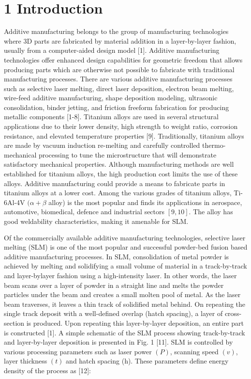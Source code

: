 \documentclass[10pt]{article}
\begin{document}
\section*{1 Introduction}
Additive manufacturing belongs to the group of manufacturing technologies where 3D parts are fabricated by material addition in a layer-by-layer fashion, usually from a computer-aided design model [1]. Additive manufacturing technologies offer enhanced design capabilities for geometric freedom that allows producing parts which are otherwise not possible to fabricate with traditional manufacturing processes. There are various additive manufacturing processes such as selective laser melting, direct laser deposition, electron beam melting, wire-feed additive manufacturing, shape deposition modeling, ultrasonic consolidation, binder jetting, and friction freeform fabrication for producing metallic components [1-8]. Titanium alloys are used in several structural applications due to their lower density, high strength to weight ratio, corrosion resistance, and elevated temperature properties [9]. Traditionally, titanium alloys are made by vacuum induction re-melting and carefully controlled thermo-mechanical processing to tune the microstructure that will demonstrate satisfactory mechanical properties. Although manufacturing methods are well established for titanium alloys, the high production cost limits the use of these alloys. Additive manufacturing could provide a means to fabricate parts in titanium alloys at a lower cost. Among the various grades of titanium alloys, Ti-6Al-4V $(\alpha+\beta$ alloy) is the most popular and finds its applications in aerospace, automotive, biomedical, defence and industrial sectors $[9,10]$. The alloy has good weldability characteristics, making it amenable for SLM.

Of the commercially available additive manufacturing technologies, selective laser melting (SLM) is one of the most popular and successful powder-bed fusion based additive manufacturing processes. In SLM, consolidation of metal powder is achieved by melting and solidifying a small volume of material in a track-by-track and layer-bylayer fashion using a high-intensity laser. In other words, the laser beam scans over a layer of powder in a straight line and melts the powder particles under the beam and creates a small molten pool of metal. As the laser beam traverses, it leaves a thin track of solidified metal behind. On repeating the single track deposit with a well-defined overlap (hatch spacing), a layer of cross-section is produced. Upon repeating this layer-by-layer deposition, an entire part is constructed [1]. A simple schematic of the SLM process showing track-by-track and layer-by-layer deposition is presented in Fig. 1 [11]. SLM is controlled by various processing parameters such as laser power $(P)$, scanning speed $(v)$, layer thickness $(t)$ and hatch spacing (h). These parameters define energy density of the process as [12]:
\end{document}
